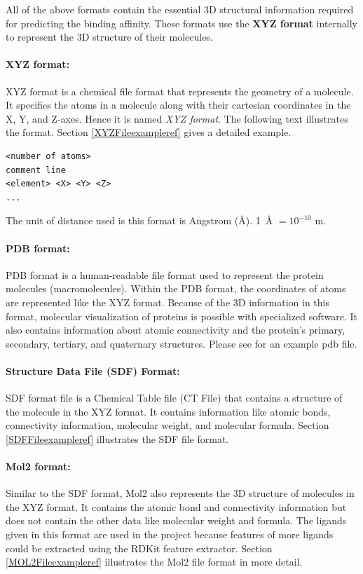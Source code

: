 \documentclass[11pt]{article}
\begin{document}
All of the above formats contain the essential 3D structural information required for predicting the binding affinity.
These formats use the \textbf{XYZ format} internally to represent the 3D structure of their molecules.

\paragraph{XYZ format:}
\label{xyz_format}
XYZ format is a chemical file format that represents the geometry of a molecule.
It specifies the atoms in a molecule along with their cartesian coordinates in the X, Y, and Z-axes.
Hence it is named \textit{XYZ format}.
The following text illustrates the format.
Section \ref{XYZFileexampleref} gives a detailed example.
\cite{XYZ_format}
\begin{verbatim}
<number of atoms>
comment line
<element> <X> <Y> <Z>
...
\end{verbatim}

The unit of distance used is this format is Angstrom (\si{\angstrom}).  \SI{1}{\angstrom} $ = 10^{-10}$ m.
\cite{XYZ_format}

\paragraph{PDB format:}
PDB format is a human-readable file format used to represent the protein molecules (macromolecules).
Within the PDB format,  the coordinates of atoms are represented like the XYZ format.
Because of the 3D information in this format,  molecular visualization of proteins is possible with specialized software. 
It also contains information about atomic connectivity and the protein's primary,  secondary,  tertiary,  and quaternary structures.
\cite{pdb_file_format}
\cite{understanding_pdb_format}
Please see \cite{examplePDBFile} for an example pdb file.


\paragraph{Structure Data File (SDF) Format:}
SDF format file is a Chemical Table file (CT File) that contains a structure of the molecule in the XYZ format.
It contains information like atomic bonds,  connectivity information,  molecular weight,  and molecular formula. \cite{SDFformat}
Section \ref{SDFFileexampleref} illustrates the SDF file format.

\paragraph{Mol2 format:}
Similar to the SDF format,  Mol2 also represents the 3D structure of molecules in the XYZ format.
It contains the atomic bond and connectivity information but does not contain the other data like molecular weight and formula.
The ligands given in this format are used in the project because features of more ligands could be extracted using the RDKit feature extractor.
Section \ref{MOL2Fileexampleref} illustrates the Mol2 file format in more detail.
\end{document}
